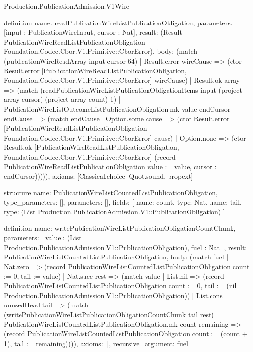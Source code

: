 \begin{lexlean}{Production.PublicationAdmission.V1Wire}
\begin{semanticmodule}
definition{
  name: readPublicationWireListPublicationObligation,
  parameters: [input : PublicationWireInput, cursor : Nat],
  result: (Result PublicationWireReadListPublicationObligation Foundation.Codec.Cbor.V1.Primitive::CborError),
  body: (match (publicationWireReadArray input cursor 64)
    | Result.error wireCause => (ctor Result.error [PublicationWireReadListPublicationObligation, Foundation.Codec.Cbor.V1.Primitive::CborError] wireCause)
    | Result.ok array => (match (readPublicationWireListPublicationObligationItems input (project array cursor) (project array count) 1)
      | PublicationWireListOutcomeListPublicationObligation.mk value endCursor endCause => (match endCause
        | Option.some cause => (ctor Result.error [PublicationWireReadListPublicationObligation, Foundation.Codec.Cbor.V1.Primitive::CborError] cause)
        | Option.none => (ctor Result.ok [PublicationWireReadListPublicationObligation, Foundation.Codec.Cbor.V1.Primitive::CborError] (record PublicationWireReadListPublicationObligation {value := value, cursor := endCursor}))))),
  axioms: [Classical.choice, Quot.sound, propext]
}

structure{
  name: PublicationWireListCountedListPublicationObligation,
  type_parameters: [],
  parameters: [],
  fields: [
    {name: count, type: Nat},
    {name: tail, type: (List Production.PublicationAdmission.V1::PublicationObligation)}
  ]
}

definition{
  name: writePublicationWireListPublicationObligationCountChunk,
  parameters: [
    value : (List Production.PublicationAdmission.V1::PublicationObligation),
    fuel : Nat
  ],
  result: PublicationWireListCountedListPublicationObligation,
  body: (match fuel
    | Nat.zero => (record PublicationWireListCountedListPublicationObligation {count := 0, tail := value})
    | Nat.succ rest => (match value
      | List.nil => (record PublicationWireListCountedListPublicationObligation {count := 0, tail := (nil Production.PublicationAdmission.V1::PublicationObligation)})
      | List.cons unusedHead tail => (match (writePublicationWireListPublicationObligationCountChunk tail rest)
        | PublicationWireListCountedListPublicationObligation.mk count remaining => (record PublicationWireListCountedListPublicationObligation {count := (count + 1), tail := remaining})))),
  axioms: [],
  recursive_argument: fuel
}


\end{semanticmodule}
\end{lexlean}
